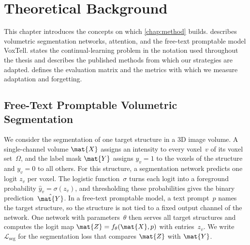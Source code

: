 %

\chapter{Theoretical Background}
\label{chap:background}

This chapter introduces the concepts on which \cref{chap:method} builds.
 describes volumetric segmentation networks, attention, and the free-text promptable model VoxTell.
 states the continual-learning problem in the notation used throughout the thesis and describes the published methods from which our strategies are adapted.
 defines the evaluation matrix and the metrics with which we measure adaptation and forgetting.

\section{Free-Text Promptable Volumetric Segmentation}
\label{sec:bg-segmentation}

We consider the segmentation of one target structure in a 3D image volume.
A single-channel volume $\mat{X}$ assigns an intensity to every voxel~$v$ of its voxel set~$\Omega$, and the label mask $\mat{Y}$ assigns $y_v = 1$ to the voxels of the structure and $y_v = 0$ to all others.
For this structure, a segmentation network predicts one logit $z_v$ per voxel.
The logistic function~$\sigma$ turns each logit into a foreground probability $\hat{y}_v = \sigma(z_v)$, and thresholding these probabilities gives the binary prediction~$\hat{\mat{Y}}$.
In a free-text promptable model, a text prompt~$p$ names the target structure, so the structure is not tied to a fixed output channel of the network.
One network with parameters~$\theta$ then serves all target structures and computes the logit map $\mat{Z} = f_\theta(\mat{X}, p)$ with entries~$z_v$.
We write $\mathcal{L}_{\mathrm{seg}}$ for the segmentation loss that compares $\mat{Z}$ with $\mat{Y}$.

